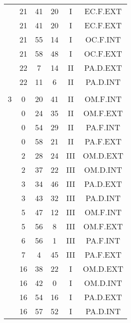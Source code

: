 \documentclass[12pt, a4paper]{article}
\begin{document}
\begin{multicols}{3}
{\begin{tabular}{c c c c c c}
	 	 	 	 & 21 & 41 & 20 & I & EC.F.EXT\\%
	 	 	 	 & 21 & 41 & 20 & I & EC.F.EXT\\%
	 	 	 	 & 21 & 55 & 14 & I & OC.F.INT\\%
	 	 	 	 & 21 & 58 & 48 & I & OC.F.EXT\\%
	 	 	 	 & 22 & 7 & 14 & II & PA.D.EXT\\%
	 	 	 	 & 22 & 11 & 6 & II & PA.D.INT\\%
	 	 	 	 & & & & & \\%
	 	 	 	3 & 0 & 20 & 41 & II & OM.F.INT\\%
	 	 	 	 & 0 & 24 & 35 & II & OM.F.EXT\\%
	 	 	 	 & 0 & 54 & 29 & II & PA.F.INT\\%
	 	 	 	 & 0 & 58 & 21 & II & PA.F.EXT\\%
	 	 	 	 & 2 & 28 & 24 & III & OM.D.EXT\\%
	 	 	 	 & 2 & 37 & 22 & III & OM.D.INT\\%
	 	 	 	 & 3 & 34 & 46 & III & PA.D.EXT\\%
	 	 	 	 & 3 & 43 & 32 & III & PA.D.INT\\%
	 	 	 	 & 5 & 47 & 12 & III & OM.F.INT\\%
	 	 	 	 & 5 & 56 & 8 & III & OM.F.EXT\\%
	 	 	 	 & 6 & 56 & 1 & III & PA.F.INT\\%
	 	 	 	 & 7 & 4 & 45 & III & PA.F.EXT\\%
	 	 	 	 & 16 & 38 & 22 & I & OM.D.EXT\\%
	 	 	 	 & 16 & 42 & 0 & I & OM.D.INT\\%
	 	 	 	 & 16 & 54 & 16 & I & PA.D.EXT\\%
	 	 	 	 & 16 & 57 & 52 & I & PA.D.INT\\%

\end{tabular}}
\end{multicols}
\end{document}
